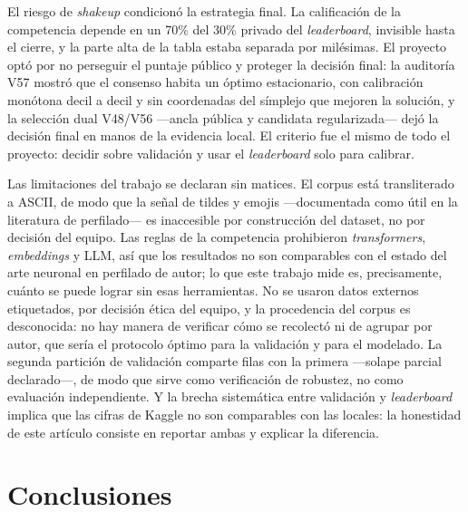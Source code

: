 \documentclass[journal]{IEEEtai}
\begin{document}
El riesgo de \textit{shakeup} condicion\'o la estrategia final. La calificaci\'on de la competencia depende en un 70\% del 30\% privado del \textit{leaderboard}, invisible hasta el cierre, y la parte alta de la tabla estaba separada por mil\'esimas. El proyecto opt\'o por no perseguir el puntaje p\'ublico y proteger la decisi\'on final: la auditor\'ia V57 mostr\'o que el consenso habita un \'optimo estacionario, con calibraci\'on mon\'otona decil a decil y sin coordenadas del s\'implejo que mejoren la soluci\'on, y la selecci\'on dual V48/V56 ---ancla p\'ublica y candidata regularizada--- dej\'o la decisi\'on final en manos de la evidencia local. El criterio fue el mismo de todo el proyecto: decidir sobre validaci\'on y usar el \textit{leaderboard} solo para calibrar.

Las limitaciones del trabajo se declaran sin matices. El corpus est\'a transliterado a ASCII, de modo que la se\~nal de tildes y emojis ---documentada como \'util en la literatura de perfilado--- es inaccesible por construcci\'on del dataset, no por decisi\'on del equipo. Las reglas de la competencia prohibieron \textit{transformers}, \textit{embeddings} y LLM, as\'i que los resultados no son comparables con el estado del arte neuronal en perfilado de autor; lo que este trabajo mide es, precisamente, cu\'anto se puede lograr sin esas herramientas. No se usaron datos externos etiquetados, por decisi\'on \'etica del equipo, y la procedencia del corpus es desconocida: no hay manera de verificar c\'omo se recolect\'o ni de agrupar por autor, que ser\'ia el protocolo \'optimo para la validaci\'on y para el modelado. La segunda partici\'on de validaci\'on comparte filas con la primera ---solape parcial declarado---, de modo que sirve como verificaci\'on de robustez, no como evaluaci\'on independiente. Y la brecha sistem\'atica entre validaci\'on y \textit{leaderboard} implica que las cifras de Kaggle no son comparables con las locales: la honestidad de este art\'iculo consiste en reportar ambas y explicar la diferencia.

\section{Conclusiones}
\end{document}
